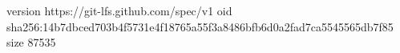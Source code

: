 version https://git-lfs.github.com/spec/v1
oid sha256:14b7dbced703b4f5731e4f18765a55f3a8486bfb6d0a2fad7ca5545565db7f85
size 87535
